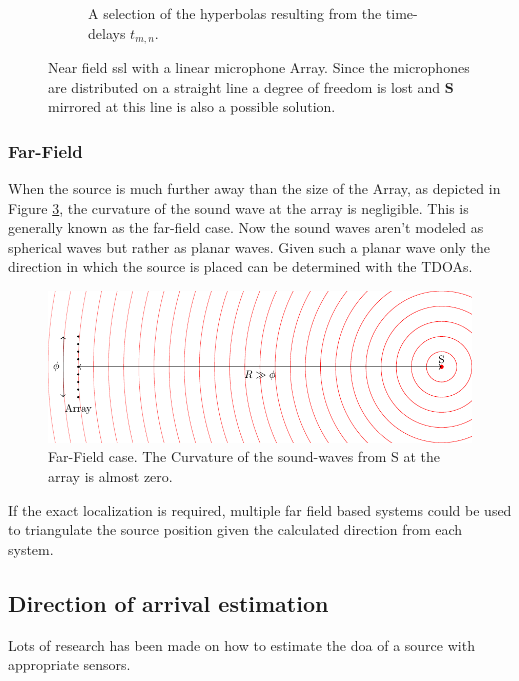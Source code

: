 \begin{figure}[h]
\begin{subfigure}[b]{0.45\textwidth}
		\caption{A selection of the hyperbolas resulting from the time-delays $t_{m,n}$.}
		\label{ssl:fig:hyperbola}
	\end{subfigure}
	\caption{Near field \acrshort{ssl} with a linear microphone Array.
		Since the microphones are distributed on a straight line a degree of freedom is lost and
		$\bm{S}$ mirrored at this line is also a possible solution.}
	\label{fig:three graphs}
\end{figure}

\subsubsection{Far-Field}
When the source is much further away than the size of the Array, as depicted
in Figure \ref{ssl:fig:far field}, the curvature of the sound wave at the array is negligible.
This is generally known as the far-field case.
Now the sound waves aren't modeled as spherical waves but rather as planar waves.
Given such a planar wave only the direction in which the source is placed can be determined with the TDOAs.

\begin{figure}
	\centering
	\includegraphics[]{FarField.pdf}
	\caption{Far-Field case. The Curvature of the sound-waves from S at the array
		is almost zero.}
	\label{ssl:fig:far field}
\end{figure}

If the exact localization is required, multiple far field based systems could be 
used to triangulate the source position given the calculated direction from each system.

\subsection{Direction of arrival estimation}
Lots of research has been made on how to estimate the \acrfull*{doa} of a source
with appropriate sensors.


